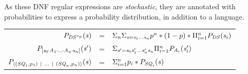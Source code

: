 \documentclass[acmsmall,screen,anonymous]{acmart}
\begin{document}
As these DNF regular expressions are \emph{stochastic}, they are annotated with
probabilities to express a probability distribution, in addition to a language.
\begin{center}
  \begin{tabular}{rcl}
    $P_{\mathit{DS}^{*_{p}}}(\mathit{s})$
    & =
    & $\Sigma_n \Sigma_{\mathit{s} = \mathit{s}_1 \ldots \mathit{s}_n}p^n*(1-p)*\Pi_{i=1}^nP_{\mathit{DS}}(\mathit{s}_i)$\\
    
    $P_{[\mathit{s}_0 \mkern-1mu\cdot\mkern-1mu \mathit{A}_1 \mkern-1mu\cdot\mkern-1mu \ldots \mkern-1mu\cdot\mkern-1mu \mathit{A}_n \mkern-1mu\cdot\mkern-1mu \mathit{s}_n]}(\mathit{s}')$
    & =
    & $\Sigma_{\mathit{s}' = \mathit{s}_0\mathit{s}_1'\ldots\mathit{s}_n'\mathit{s}_n}\Pi_{i = 1}^nP_{\mathit{A}_i}(\mathit{s}_i')$ \\
    
    $P_{\langle(\mathit{SQ}_1,p_1) ~|~ \ldots ~|~ (\mathit{SQ}_n,p_n)\rangle}(\mathit{s})$
    & =
    & $\Sigma_{i=1}^np_i * P_{\mathit{SQ}_i}(\mathit{s})$\\
  \end{tabular}
\end{center}
\end{document}
